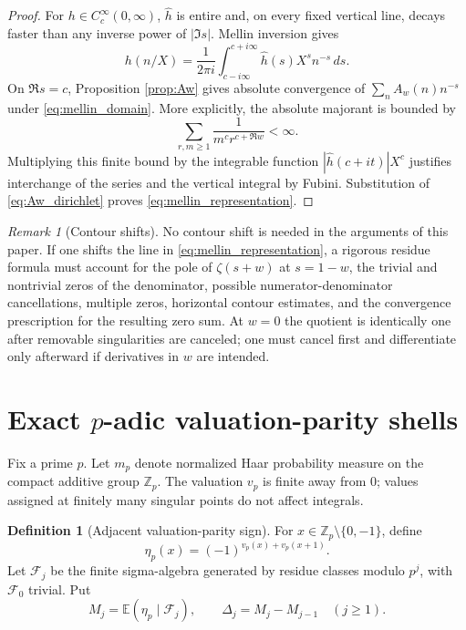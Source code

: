 \documentclass[11pt]{amsart}
\numberwithin{equation}{section}
\theoremstyle{plain}
\theoremstyle{definition}
\newtheorem{definition}[theorem]{Definition}
\theoremstyle{remark}
\newtheorem{remark}[theorem]{Remark}
\newcommand{\Z}{\mathbb Z}
\newcommand{\E}{\mathbb E}
\begin{document}
\begin{proof}
For $h\in C_c^\infty(0,\infty)$, $\widehat h$ is entire and, on every fixed vertical line, decays faster than any inverse power of $|\Im s|$.  Mellin inversion gives
\begin{equation}
h(n/X)=\frac1{2\pi i}\int_{c-i\infty}^{c+i\infty}\widehat h(s)X^s n^{-s}\,ds.
\label{eq:mellin_inversion}
\end{equation}
On $\Re s=c$, Proposition \ref{prop:Aw} gives absolute convergence of $\sum_n A_w(n)n^{-s}$ under \eqref{eq:mellin_domain}.  More explicitly, the absolute majorant is bounded by
\begin{equation}
\sum_{r,m\ge1}\frac1{m^c r^{c+\Re w}}<\infty.
\label{eq:mellin_series_majorant}
\end{equation}
Multiplying this finite bound by the integrable function $|\widehat h(c+it)|X^c$ justifies interchange of the series and the vertical integral by Fubini.  Substitution of \eqref{eq:Aw_dirichlet} proves \eqref{eq:mellin_representation}.
\end{proof}

\begin{remark}[Contour shifts]
\label{rem:contour_shifts}
No contour shift is needed in the arguments of this paper.  If one shifts the line in \eqref{eq:mellin_representation}, a rigorous residue formula must account for the pole of $\zeta(s+w)$ at $s=1-w$, the trivial and nontrivial zeros of the denominator, possible numerator-denominator cancellations, multiple zeros, horizontal contour estimates, and the convergence prescription for the resulting zero sum.  At $w=0$ the quotient is identically one after removable singularities are canceled; one must cancel first and differentiate only afterward if derivatives in $w$ are intended.
\end{remark}

\section{Exact \texorpdfstring{$p$}{p}-adic valuation-parity shells}
\label{sec:padic_shells}

Fix a prime $p$.  Let $m_p$ denote normalized Haar probability measure on the compact additive group $\Z_p$.  The valuation $v_p$ is finite away from $0$; values assigned at finitely many singular points do not affect integrals.

\begin{definition}[Adjacent valuation-parity sign]
\label{def:eta_p}
For $x\in\Z_p\setminus\{0,-1\}$, define
\begin{equation}
\eta_p(x)=(-1)^{v_p(x)+v_p(x+1)}.
\label{eq:eta_p}
\end{equation}
Let $\mathcal F_j$ be the finite sigma-algebra generated by residue classes modulo $p^j$, with $\mathcal F_0$ trivial.  Put
\begin{equation}
M_j=\E(\eta_p\mid\mathcal F_j),
\qquad
\Delta_j=M_j-M_{j-1}\quad(j\ge1).
\label{eq:padic_martingale}
\end{equation}
\end{definition}
\end{document}
